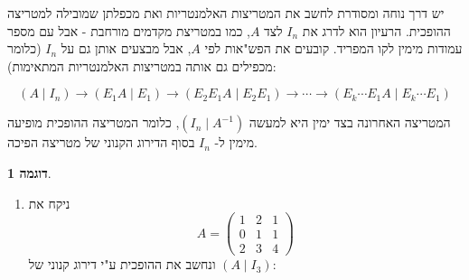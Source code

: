 \documentclass[12pt]{report}
\theoremstyle{plain}
\theoremstyle{definition}
\newtheorem{example}{דוגמה}[chapter]
\newcommand{\0}{\mathbf{0}}
\begin{document}
יש דרך נוחה ומסודרת לחשב את המטריצות האלמנטריות ואת מכפלתן שמובילה למטריצה ההופכית. הרעיון הוא לדרג את 
$I_n$
לצד
$A$,
כמו במטריצת מקדמים מורחבת - אבל עם מספר עמודות מימין לקו המפריד. קובעים את הפש"אות לפי 
$A$,
אבל מבצעים אותן גם על
$I_n$ 
(כלומר מכפילים גם אותה במטריצות האלמנטריות המתאימות):

$$
(A\mid I_n)\rightarrow (E_1A\mid E_1)\rightarrow (E_2E_1A\mid E_2E_1)\rightarrow \cdots \rightarrow(E_k\cdots E_1A \mid E_k\cdots E_1)
$$

המטריצה האחרונה בצד ימין היא למעשה
$(I_n \mid A^{-1})$,
כלומר המטריצה ההופכית מופיעה מימין ל-
$I_n$
בסוף הדירוג הקנוני של מטריצה הפיכה.


\begin{example}
\begin{enumerate}[label=\alph*.]
\item
ניקח את
$$
A=\begin{pmatrix}
1 & 2 & 1 \\
0 & 1 & 1 \\
2 & 3 & 4 
\end{pmatrix}
$$
ונחשב את ההופכית ע"י דירוג קנוני של 
$(A \mid I_3)$:


\end{enumerate}
\end{example}
\end{document}
